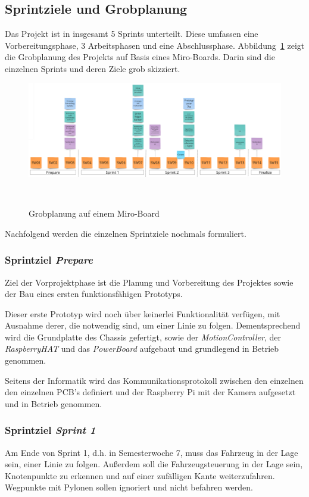\documentclass[main.tex]{subfiles} %
\begin{document}
\subsection{Sprintziele und Grobplanung}

Das Projekt ist in insgesamt 5 Sprints unterteilt. Diese umfassen eine
Vorbereitungsphase, 3 Arbeitsphasen und eine Abschlussphase.
Abbildung~\ref{fig:Grobplanung} zeigt die Grobplanung des Projekts auf Basis
eines Miro-Boards. Darin sind die einzelnen Sprints und deren Ziele grob
skizziert.

\begin{figure}[h]
    \centering
    \includegraphics[width=1\textwidth]{./Grobplanung_MiroBoard.png}
    \caption{Grobplanung auf einem Miro-Board}~\label{fig:Grobplanung}
\end{figure}

Nachfolgend werden die einzelnen Sprintziele nochmals formuliert.

\subsubsection*{Sprintziel \textit{Prepare}}
Ziel der Vorprojektphase ist die Planung und Vorbereitung des Projektes sowie
der Bau eines ersten funktionsfähigen Prototyps.

Dieser erste Prototyp wird noch über keinerlei Funktionalität verfügen, mit
Ausnahme derer, die notwendig sind, um einer Linie zu folgen. Dementsprechend
wird die Grundplatte des Chassis gefertigt, sowie der
\textit{MotionController}, der \textit{RaspberryHAT} und das
\textit{PowerBoard} aufgebaut und grundlegend in Betrieb genommen.

Seitens der Informatik wird das Kommunikationsprotokoll zwischen den einzelnen
den einzelnen PCB's definiert und der Raspberry Pi mit der Kamera aufgesetzt
und in Betrieb genommen.

\subsubsection*{Sprintziel \textit{Sprint 1}}
Am Ende von Sprint 1, d.h. in Semesterwoche 7, muss das Fahrzeug in der Lage sein,
einer Linie zu folgen. Außerdem soll die Fahrzeugsteuerung in der Lage sein,
Knotenpunkte zu erkennen und auf einer zufälligen Kante weiterzufahren. Wegpunkte
mit Pylonen sollen ignoriert und nicht befahren werden.
\end{document}
